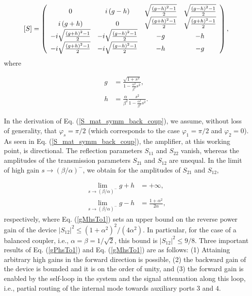 \documentclass[aip,onecolumn,10pt]{revtex4}%
\begin{document}
\begin{equation}
\left[  S\right]  =\left(
\begin{array}
[c]{cccc}%
0 & i\left(  g-h\right)   & \sqrt{\frac{\left(  g-h\right)  ^{2}-1}{2}} &
\sqrt{\frac{\left(  g-h\right)  ^{2}-1}{2}}\\
i\left(  g+h\right)   & 0 & \sqrt{\frac{\left(  g+h\right)  ^{2}-1}{2}} &
\sqrt{\frac{\left(  g+h\right)  ^{2}-1}{2}}\\
-i\sqrt{\frac{\left(  g+h\right)  ^{2}-1}{2}} & -i\sqrt{\frac{\left(
		g-h\right)  ^{2}-1}{2}} & -g & -h\\
-i\sqrt{\frac{\left(  g+h\right)  ^{2}-1}{2}} & -i\sqrt{\frac{\left(
		g-h\right)  ^{2}-1}{2}} & -h & -g
\end{array}
\right)  ,\label{S_mat_symm_back_coup}%
\end{equation}
where 

\begin{align}
g &  =\frac{\sqrt{1+s^{2}}}{1-\frac{\alpha^{2}}{\beta^{2}}s^{2}},\label{gWalpha}\\
h &  =\frac{\alpha}{\beta^{2}}\frac{s^{2}}{1-\frac{\alpha^{2}}{\beta^{2}}s^{2}}.\label{hWalpha}%
\end{align}

In the derivation of Eq. (\ref{S_mat_symm_back_coup}), we assume, without loss of generality, that $\varphi_s=\pi/2$ (which corresponds to the case $\varphi_1=\pi/2$ and $\varphi_2=0$). As seen in Eq. (\ref{S_mat_symm_back_coup}), the amplifier, at this working point, is directional. The reflection parameters $S_{11}$ and $S_{22}$ vanish, whereas the amplitudes of the transmission parameters $S_{21}$ and $S_{12}$ are unequal. In the limit of high gain $s\rightarrow{(\beta/\alpha)}^{-}$, we obtain for the amplitudes of $S_{21}$ and $S_{12}$,

\begin{align}
\lim_{s\rightarrow{(\beta/\alpha)}^{-}}g+h  & =+\infty,\label{gPhsTo1}\\
\lim_{s\rightarrow{(\beta/\alpha)}^{-}}g-h  & =\frac{1+\alpha^2}{2\alpha},\label{gMhsTo1}%
\end{align}
respectively, where Eq. (\ref{gMhsTo1}) sets an upper bound on the reverse power gain of the device $|S_{12}|^2\leq(1+\alpha^2)^2/(4\alpha^2)$. In particular, for the case of a balanced coupler, i.e., $\alpha=\beta=1/\sqrt{2}$, this bound is $|S_{12}|^2\leq9/8$. Three important results of Eq. (\ref{gPhsTo1}) and Eq. (\ref{gMhsTo1}) are as follows: (1) Attaining arbitrary high gains in the forward direction is possible, (2) the backward gain of the device is bounded and it is on the order of unity, and (3) the forward gain is enabled by the self-loop in the system and the signal attenuation along this loop, i.e., partial routing of the internal mode towards auxiliary ports $3$ and $4$.   
\end{document}

